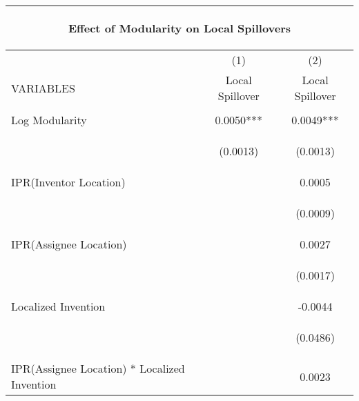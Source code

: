 \begin{center}
\begin{tabular}{lcc}
\multicolumn{3}{c}{\begin{large}Effect of Modularity on Local Spillovers\label{a6}\end{large}} \\ \hline
 & (1) & (2) \\
VARIABLES & Local Spillover & Local Spillover \\ \hline
\vspace{4pt} & \begin{footnotesize}\end{footnotesize} & \begin{footnotesize}\end{footnotesize} \\
Log Modularity & 0.0050*** & 0.0049*** \\
\vspace{4pt} & \begin{footnotesize}(0.0013)\end{footnotesize} & \begin{footnotesize}(0.0013)\end{footnotesize} \\
IPR(Inventor Location) &  & 0.0005 \\
\vspace{4pt} & \begin{footnotesize}\end{footnotesize} & \begin{footnotesize}(0.0009)\end{footnotesize} \\
IPR(Assignee Location) &  & 0.0027 \\
\vspace{4pt} & \begin{footnotesize}\end{footnotesize} & \begin{footnotesize}(0.0017)\end{footnotesize} \\
Localized Invention &  & -0.0044 \\
\vspace{4pt} & \begin{footnotesize}\end{footnotesize} & \begin{footnotesize}(0.0486)\end{footnotesize} \\
IPR(Assignee Location) * Localized Invention &  & 0.0023 \\

\end{tabular}
\end{center}
